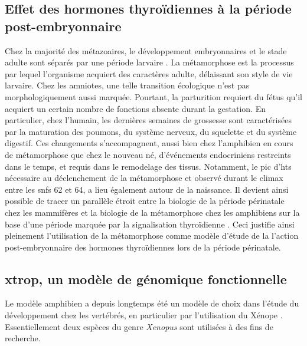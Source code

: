 \documentclass[../main.tex]{subfiles}
\begin{document}

\subsection{Effet des hormones thyroïdiennes à la période post-embryonnaire}
Chez la majorité des métazoaires, le développement embryonnaires et le stade adulte sont séparés par une période larvaire \citep{Laudet2011,Holstein2014}.
La métamorphose est la processus par lequel l'organisme acquiert des caractères adulte, délaissant son style de vie larvaire.
Chez les amniotes, une telle transition écologique n'est pas morphologiquement aussi marquée.
Pourtant, la parturition requiert du fétus qu'il acquiert un certain nombre de fonctions absente durant la gestation.
En particulier, chez l'humain, les dernières semaines de grossesse sont caractérisées par la maturation des poumons, du système nerveux, du squelette et du système digestif.
Ces changements s'accompagnent, aussi bien chez l'amphibien en cours de métamorphose que chez le nouveau né, d'événements endocriniens restreints dans le temps, et requis dans le remodelage des tissus.
Notamment, le pic d'\glspl{ht} nécessaire au déclenchement de la métamorphose et observé durant le climax entre les \glspl{snf} 62 et 64, a lieu également autour de la naissance.
Il devient ainsi possible de tracer un parallèle étroit entre la biologie de la période périnatale chez les mammifères et la biologie de la métamorphose chez les amphibiens sur la base d'une période marquée par la signalisation thyroïdienne \citep{Laudet2011}.
Ceci justifie ainsi pleinement l'utilisation de la métamorphose comme modèle d'étude de la l'action post-embryonnaire des hormones thyroïdiennes lors de la période périnatale. 


\subsection{\gls{xtrop}, un modèle de génomique fonctionnelle}\label{subsec:xtrop-model}
Le modèle amphibien a depuis longtemps été un modèle de choix dans l'étude du développement chez les vertébrés, en particulier par l'utilisation du Xénope \citep{Harland2011}.
Essentiellement deux espèces du genre \textit{Xenopus} sont utilisées à des fins de recherche.
\end{document}
